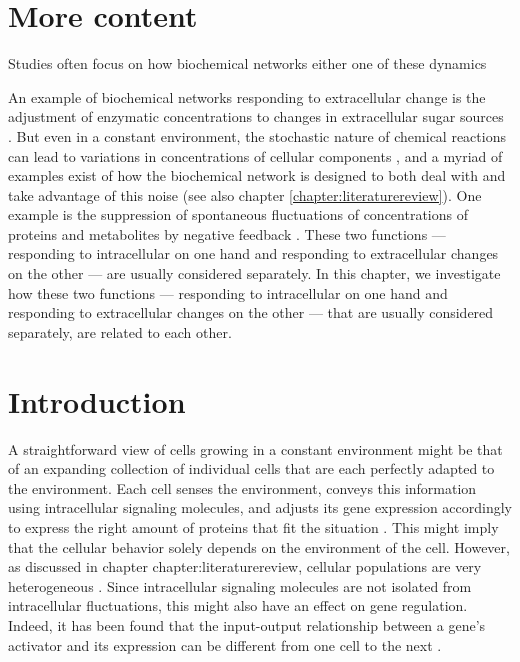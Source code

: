 

\section{More content}




Studies often focus on how biochemical networks either one of these dynamics

An example of biochemical networks responding to extracellular change is the adjustment of enzymatic concentrations to changes in extracellular sugar sources \cite{Towbin2017}.
But even in a constant environment, the stochastic nature of chemical reactions can lead to variations in concentrations of cellular components  \cite{Elowitz2002,Kiviet2014}, 
and a myriad of examples exist of how the biochemical network is designed to both deal with and take advantage of this noise (see also chapter \ref{chapter:literaturereview}).
One example is the suppression of spontaneous fluctuations of concentrations of proteins and metabolites by negative feedback \cite{Brandman2008, Lestas2010, Bowsher2013}.
These two functions --- responding to intracellular on one hand and responding to extracellular changes on the other --- are usually considered separately.
In this chapter, we investigate how these two functions --- responding to intracellular on one hand and responding to extracellular changes on the other --- that are usually considered separately, are related to each other.



\section{Introduction}


A straightforward view of cells growing in a constant environment might be 
that of an expanding collection of individual cells that are each perfectly adapted to the environment.
%
Each cell senses the environment, 
conveys this information using intracellular signaling molecules, 
and adjusts its gene expression accordingly to 
express the right amount of proteins that fit the situation \cite{Bray1995, Alon2006, Alon2007, Tyson2010}.
%
This might imply that the cellular behavior solely depends on the environment of the cell.
%
However, as discussed in chapter {chapter:literaturereview}, cellular populations are very heterogeneous \cite{Kiviet2014, Hashimoto2016}.
%
Since intracellular signaling molecules are not isolated from intracellular fluctuations, 
this might also have an effect on gene regulation.
%
Indeed, it has been found that the input-output relationship between a gene's activator and its expression can be different from one cell to the next \cite{Rosenfeld2005, Keegstra2017}.

